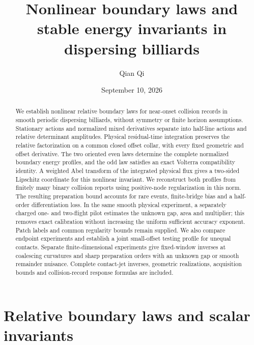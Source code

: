 
\title[Nonlinear boundary laws and stable energy invariants]{Nonlinear boundary laws and stable energy invariants
in dispersing billiards}
\author{Qian Qi}
\date{September 10, 2026}

\begin{abstract}
We establish nonlinear relative boundary laws for near-onset collision
records in smooth periodic dispersing billiards, without symmetry or
finite horizon assumptions. Stationary actions and normalized mixed
derivatives separate into half-line actions and relative determinant
amplitudes. Physical residual-time integration preserves the relative
factorization on a common closed offset collar, with every fixed
geometric and offset derivative. The two oriented even laws determine
the complete normalized boundary energy profiles, and the odd law
satisfies an exact Volterra compatibility identity. A weighted Abel
transform of the integrated physical flux gives a two-sided Lipschitz
coordinate for this nonlinear invariant. We reconstruct both profiles
from finitely many binary collision reports using positive-node
regularization in this norm. The resulting preparation bound accounts
for rare events, finite-bridge bias and a half-order differentiation
loss. In the same smooth physical experiment, a separately charged
one- and two-flight pilot estimates the unknown gap, area and multiplier;
this removes exact calibration without increasing the uniform sufficient
accuracy exponent. Patch labels and common regularity bounds remain
supplied. We also compare endpoint experiments and establish a joint
small-offset testing profile for unequal contacts. Separate
finite-dimensional experiments give fixed-window inverses at coalescing
curvatures and sharp preparation orders with an unknown gap or smooth
remainder nuisance. Complete contact-jet inverses, geometric realizations,
acquisition bounds and collision-record response formulas are included.
\end{abstract}
\maketitle

\part{Relative boundary laws and scalar invariants}










